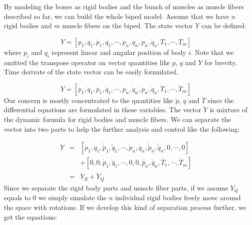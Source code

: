 \documentclass[a4paper,10pt]{article}
\begin{document}
By modeling the bones as rigid bodies and the bunch of muscles as muscle
fibers described so far, we can build the whole biped model. Assume that
we have $n$ rigid bodies and $m$ muscle fibers on the biped. The state vector
$Y$ can be defined:

\begin{equation}
Y = [ p_1, q_1, \dot{p}_1, \dot{q}_1, \cdots ,
      p_n, q_n, \dot{p}_n, \dot{q}_n,
      T_1, \cdots, T_m]
\end{equation}
where $p_i$ and $q_i$ represent linear and angular position of body $i$.
Note that we omitted the transpose operator on vector quantities like $p$,
$q$ and $Y$ for brevity. Time derivate of the state vector can be easily
formulated.

\begin{equation}
\dot{Y} = [ \dot{p}_1, \dot{q}_1, \ddot{p}_1, \ddot{q}_1, \cdots ,
            \dot{p}_n, \dot{q}_n, \ddot{p}_n, \ddot{q}_n,
            \dot{T}_1, \cdots, \dot{T}_m]
\end{equation}
Our concern is mostly concentrated to the quantities like $\ddot{p}$,
$\ddot{q}$ and $\dot{T}$ since the differential equations are formulated
in these variables. The vector $\dot{Y}$ is mixture
of the dynamic formula for rigid bodies and muscle fibers. We can separate
the vector into two parts to help the further analysis and control like the
following:

\begin{eqnarray*}\label{dotY1}
\dot{Y} & = & [ \dot{p}_1, \dot{q}_1, \ddot{\tilde{p}}_1, \ddot{\tilde{q}}_1, \cdots ,
                \dot{p}_n, \dot{q}_n, \ddot{\tilde{p}}_n, \ddot{\tilde{q}}_n,
                0, \cdots, 0] \\
        &   & + [ 0, 0, \ddot{\bar{p}}_1, \ddot{\bar{q}}_1, \cdots ,
                0, 0, \ddot{\bar{p}}_n, \ddot{\bar{q}}_n,
                \dot{T}_1, \cdots, \dot{T}_m]\\
        & = & \dot{Y}_R + \dot{Y}_Q
\end{eqnarray*}
Since we separate the rigid body parts and muscle fiber parts, if we
assume $\dot{Y}_Q$ equals to 0 we simply simulate the $n$ individual
rigid bodies freely move around the space with rotations. If we develop
this kind of separation process further, we get the equations:
\end{document}
